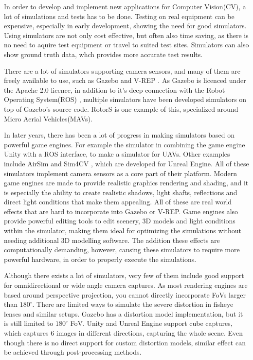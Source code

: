 In order to develop and implement new applications for Computer Vision(CV), a lot of simulations and tests has to be done. Testing on real equipment can be expensive, especially in early development, showing the need for good simulators. Using simulators are not only cost effective, but often also time saving, as there is no need to aquire test equipment or travel to suited test sites. Simulators can also show ground truth data, whch provides more accurate test results. 

There are a lot of simulators supporting camera sensors, and many of them are freely available to use, such as Gazebo \cite{GazeboPaper} and V-REP \cite{VREP2013}. As Gazebo is licenced under the Apache 2.0 licence, in addition to it's deep connection with the Robot Operating System(ROS) \cite{ROSpaper}, multiple simulators have been developed simulators on top of Gazebo's source code. RotorS \cite{RotorS} is one example of this, specialized around Micro Aerial Vehicles(MAVs). 

In later years, there has been a lot of progress in making simulators based on powerful game engines. For example the simulator in \cite{UnityROSsim} combining the game engine Unity with a ROS interface, to make a simulator for UAVs. Other examples include AirSim \cite{Airsim_paper} and Sim4CV \cite{Sim4CV_paper}, which are developed for Unreal Engine. All of these simulators implement camera sensors as a core part of their platform. Modern game engines are made to provide realistic graphics rendering and shading, and it is especially the ability to create realistic shadows, light shafts, reflections and direct light conditions that make them appealing. All of these are real world effects that are hard to incorporate into Gazebo or V-REP. Game engines also provide powerful editing tools to edit scenery, 3D models and light conditions within the simulator, making them ideal for optimizing the simulations without needing additional 3D modelling software. The addition these effects are computationally demanding, however, causing these simulators to require more powerful hardware, in order to properly execute the simulations.

Although there exists a lot of simulators, very few of them include good support for omnidirectional or wide angle camera captures. As most rendering engines are based around perspective projection, you cannot directly incorporate FoVs larger than $180^\circ$. There are limited ways to simulate the severe distortion in fisheye lenses and similar setups. Gazebo has a distortion model implementation, but it is still limited to $180^\circ$ FoV. Unity and Unreal Engine support cube captures, which captures 6 images in different directions, capturing the whole scene. Even though there is no direct support for custom distortion models, similar effect can be achieved through post-processing methods.

